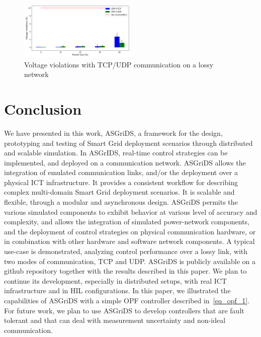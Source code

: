 \documentclass[conference]{IEEEtran}
\begin{document}
\begin{figure}[ht]
	\centering
	\includegraphics[width=0.5\textwidth]{bars_loss.png}
	\caption{Voltage violations with TCP/UDP communication on a lossy network}
	\label{bars_loss}
\end{figure}

\section{Conclusion}
We have presented in this work, ASGriDS, a framework for the design, prototyping and testing of Smart Grid deployment scenarios through distributed and scalable simulation. In ASGrIDS, real-time control strategies can be implemented, and deployed on a communication network. ASGriDS allows the integration of emulated communication links, and/or the deployment over a physical ICT infrastructure. It provides a consistent workflow for describing complex multi-domain Smart Grid deployment scenarios. It is scalable and flexible, through a modular and asynchronous design. ASGriDS permits the various simulated components to exhibit behavior at various level of accuracy and complexity, and allows the integration of simulated power-network components, and the deployment of control strategies on physical communication hardware, or in combination with other hardware and software network components. A typical use-case is demonstrated, analyzing control performance over a lossy link, with two modes of communication, TCP and UDP.
ASGriDS is publicly available on a github repository\cite{TakiennAsgrids} together with the results described in this paper. We plan to continue its development, especially in distributed setups, with real ICT infrastructure and in HIL configurations. In this paper, we illustrated the capabilities of ASGriDS with a simple OPF controller described in~\eqref{eq_opf_1}. For future work, we plan to use ASGriDS to develop controllers that are fault tolerant and that can deal with measurement uncertainty and non-ideal communication.

  

\end{document}
